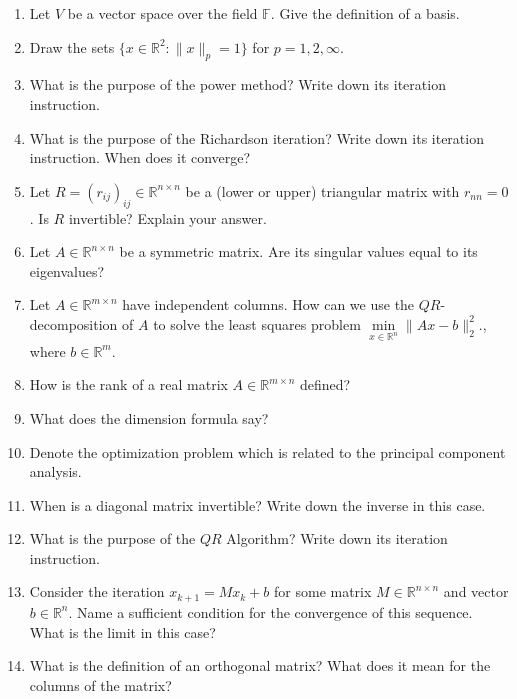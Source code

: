 \begin{enumerate}
	\item Let $V$ be a vector space over the field $\mathbb{F}$. Give the definition of a basis.
	\item Draw the sets $\{x \in \mathbb{R}^{2} \colon \|x\|_p = 1   \}$ for $p=1,2,\infty$.
	\item What is the purpose of the power method? Write down its iteration instruction.
	\item What is the purpose of the Richardson iteration? Write down its iteration instruction. When does it converge?
	\item Let $R=(r_{ij})_{ij} \in \mathbb{R}^{n \times n}$ be a (lower or upper) triangular matrix with $r_{nn} = 0$. Is $R$ invertible? Explain your answer.
	\item Let $A \in \mathbb{R}^{n \times n}$ be a symmetric matrix. Are its singular values equal to its eigenvalues?
	\item Let  $A \in \mathbb{R}^{m \times n}$ have independent columns. How can we use the $QR$-decomposition of $A$ to solve the least squares problem $
	\min\limits_{x \in \mathbb{R}^n } \| Ax - b \|_2^2.
	$, where $b \in \mathbb{R}^{m}$.
	\item How is the rank of a real matrix $A \in \mathbb{R}^{m \times n}$ defined?
%
	\item What does the dimension formula say?
%
	\item Denote the optimization problem which is related to the principal component analysis.
	\item When is a diagonal matrix invertible? Write down the inverse in this case.
	\item What is the purpose of the $QR$ Algorithm? Write down its iteration instruction.
	\item Consider the iteration $x_{k+1} = Mx_k + b$ for some matrix $M \in \mathbb{R}^{n \times n}$ and vector $b \in \mathbb{R}^n$. Name a sufficient condition for the convergence of this sequence. What is the limit in this case?
	\item What is the definition of an orthogonal matrix? What does it mean for the columns of the matrix?
\end{enumerate}

